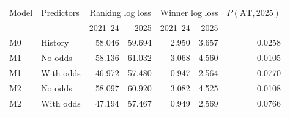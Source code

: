 \begin{tabular}{llrrrrr}
\toprule
Model & Predictors & \multicolumn{2}{c}{Ranking log loss} & \multicolumn{2}{c}{Winner log loss} & $P(\mathrm{AT},2025)$ \\ 
 & & 2021--24 & 2025 & 2021--24 & 2025 & \\
\midrule
M0 & History & 58.046 & 59.694 & 2.950 & 3.657 & 0.0258 \\
M1 & No odds & 58.136 & 61.032 & 3.068 & 4.560 & 0.0105 \\
M1 & With odds & 46.972 & 57.480 & 0.947 & 2.564 & 0.0770 \\
M2 & No odds & 58.097 & 60.920 & 3.082 & 4.525 & 0.0108 \\
M2 & With odds & 47.194 & 57.467 & 0.949 & 2.569 & 0.0766 \\
\bottomrule
\end{tabular}
